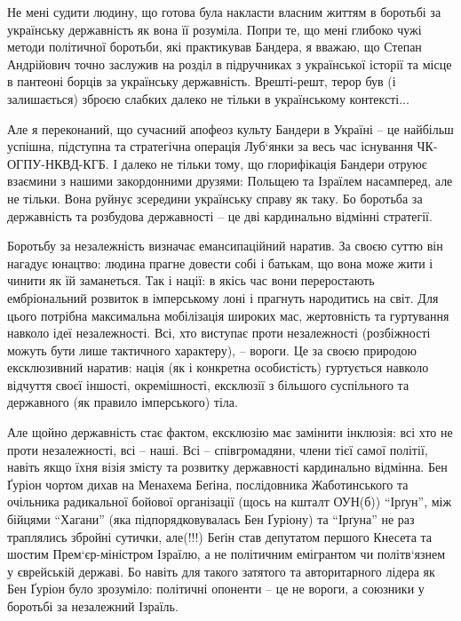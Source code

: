 Не мені судити людину, що готова була накласти власним життям в боротьбі за
українську державність як вона її розуміла. Попри те, що мені глибоко чужі
методи політичної боротьби, які практикував Бандера, я вважаю, що Степан
Андрійович точно заслужив на розділ в підручниках з української історії та
місце в пантеоні борців за українську державність. Врешті-решт, терор був (і
залишається) зброєю слабких далеко не тільки в українському контексті...

Але я переконаний, що сучасний апофеоз культу Бандери в Україні – це найбільш
успішна, підступна та стратегічна операція Луб‘янки за весь час існування
ЧК-ОГПУ-НКВД-КГБ. І далеко не тільки тому, що глорифікація Бандери отруює
взаємини з нашими закордонними друзями: Польщею та Ізраїлем насамперед, але не
тільки. Вона руйнує зсередини українську справу як таку. Бо боротьба за
державність та розбудова державності – це дві кардинально відмінні стратегії.

Боротьбу за незалежність визначає емансипаційний наратив. За своєю суттю він
нагадує юнацтво: людина прагне довести собі і батькам, що вона може жити і
чинити як їй заманеться. Так і нації: в якісь час вони переростають
ембріональний розвиток в імперському лоні і прагнуть народитись на світ. Для
цього потрібна максимальна мобілізація широких мас, жертовність та гуртування
навколо ідеї незалежності. Всі, хто виступає проти незалежності (розбіжності
можуть бути лише тактичного характеру), – вороги. Це за своєю природою
ексклюзивний наратив: нація (як і конкретна особистість) гуртується навколо
відчуття своєї іншості, окремішності, ексклюзії з більшого суспільного та
державного (як правило імперського) тіла.

Але щойно державність стає фактом, ексклюзію має замінити інклюзія: всі хто не
проти незалежності, всі – наші. Всі – співгромадяни, члени тієї самої політії,
навіть якщо їхня візія змісту та розвитку державності кардинально відмінна. Бен
Ґуріон чортом дихав на Менахема Беґіна, послідовника Жаботинського та очільника
радикальної бойової організації (щось на кшталт ОУН(б)) \enquote{Ірґун}, між бійцями
\enquote{Хагани} (яка підпорядковувалась Бен Ґуріону) та \enquote{Ірґуна} не раз траплялись
збройні сутички, але(!!!) Беґін став депутатом першого Кнесета та шостим
Прем‘єр-міністром Ізраїлю, а не політичним емігрантом чи політв‘язнем у
єврейській державі. Бо навіть для такого затятого та авторитарного лідера як
Бен Ґуріон було зрозуміло: політичні опоненти – це не вороги, а союзники у
боротьбі за незалежний Ізраїль. 

